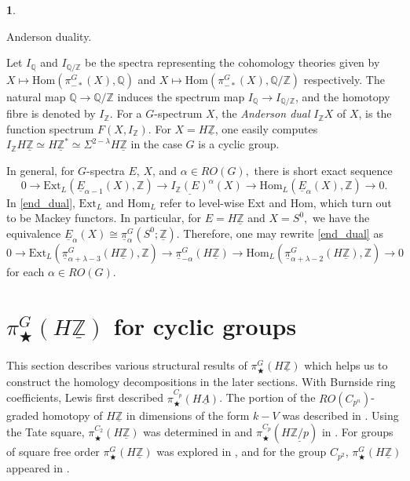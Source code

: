 \documentclass[a4paper,leqno,11pt]{amsart}
\theoremstyle{plain}
\theoremstyle{definition}
\newtheorem{subsec}[theorem]{}
\theoremstyle{remark}
\theoremstyle{definition}
\newcommand{\Z}{{\mathbb{Z}}}
\newcommand{\Q}{{\mathbb Q}}
\newcommand{\Hom}{\mbox{Hom}}
\newcommand{\upi}{\underline{\pi}}
\newcommand{\uE}{\underline{E}}
\newcommand{\Ext}{\mbox{Ext}}
\newenvironment{myeq}[1][]
{\stepcounter{theorem}\begin{equation}\tag{\thetheorem}{#1}}
	{\end{equation}}
\newenvironment{mysubsection}[2][]
{\begin{subsec}\begin{upshape}\begin{bfseries}{#2.}
			\end{bfseries}{#1}}
		{\end{upshape}\end{subsec}}
\newcommand{\uA}{\underline{A}}
\newcommand{\uZ}{\underline{\mathbb{Z}}}
\def\Z{\mathbb{Z}}
\numberwithin{equation}{section}
\newcommand{\Zp}{\underline{{\mathbb Z}/p}}
\begin{document}
	\begin{mysubsection}{Anderson duality}
Let $I_{\Q}$ and $I_{\Q/\Z}$ be the spectra representing the cohomology theories given by $X \mapsto \Hom(\pi_{-\ast}^G(X), \Q)$ and $X \mapsto \Hom(\pi_{-\ast}^G(X), \Q/\Z)$ respectively. The natural map $\Q \to \Q/\Z$ induces the spectrum map $I_{\Q} \to I_{\Q/\Z}$, and the homotopy fibre is denoted by $I_{\Z}$. For a $G$-spectrum $X$, the \emph{Anderson dual} $I_{\Z}X$ of $X$, is the function spectrum $F(X, I_{\Z})$. For $X=H\uZ$, one easily computes $I_{\Z}H\uZ \simeq H\uZ^\ast\simeq \Sigma^{2-\lambda}H\uZ$ \cite{BG20,Zeng} in the case $G$ is a cyclic group. 


In general, for $G$-spectra $E$, $X$, and $\alpha \in RO(G),$ there is short exact sequence  
\begin{myeq}\label{end_dual}
0 \to \Ext_L(\uE_{\alpha -1}(X), \Z) \to \underline{I_{\Z}(E)}^{\alpha}(X) \to \Hom_L(\uE_{\alpha}(X), \Z)\to 0.
\end{myeq}
 In \eqref{end_dual}, $\Ext_L$ and $\Hom_L$ refer to level-wise $\Ext$ and $\Hom$, which turn out to be Mackey functors. In particular, for $E=H\uZ$ and $X=S^0,$ we have the equivalence $\uE_\alpha(X) \cong \upi^G_\alpha (S^0; \uZ)$. Therefore, one may rewrite \eqref{end_dual} as
 \begin{myeq}\label{and_comp}
 0 \to  \Ext_L(\upi_{\alpha+\lambda -3}^{G}(H\uZ), \Z) \to \upi_{-\alpha}^{G}(H\uZ) \to \Hom_L(\upi_{\alpha+\lambda -2}^{G}(H\uZ), \Z) \to 0
 \end{myeq}
 for each $\alpha \in RO(G).$ 
\end{mysubsection}
	
	
	\section{$ \pi^G_{\bigstar}(H\uZ) $ for cyclic  groups}\label{eqicyc}
	This section describes various structural results of $ \pi^G_{\bigstar}(H\uZ) $  which helps us to construct the homology decompositions in the later sections.  With Burnside ring coefficients, Lewis \cite{Lewis} first described $ \pi^{C_p}_\bigstar(H\uA) $. The portion of the $  RO(C_{p^n} )$-graded homotopy of $H\uZ$ in dimensions of the form $ k - V $ was described in \cite{HHR-realKthy,HHR-slicess}. Using the Tate square,  $ \pi^{C_2}_\bigstar(H\uZ) $ was determined in \cite{Greenlees} and $ \pi^{C_p}_\bigstar(H\Zp) $ in \cite{BasuGhosh-cp}. For groups of square free order $ \pi^G_\bigstar(H\uZ) $ was explored in \cite{BG20}, and for the group $ C_{p^2} $, $ \pi^G_\bigstar(H\uZ) $ appeared in \cite{Zeng}. 
\end{document}
